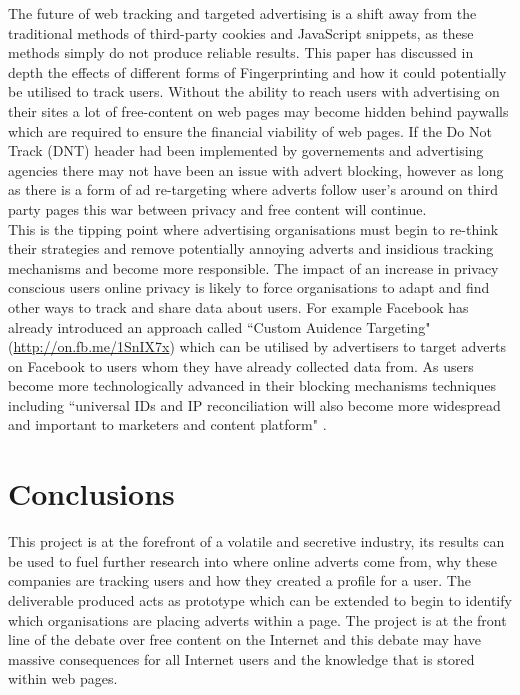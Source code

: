 \documentclass[12pt]{article}
\begin{document}
The future of web tracking and targeted advertising is a shift away from the traditional methods of third-party cookies and JavaScript snippets, as these methods simply do not produce reliable results. This paper has discussed in depth the effects of different forms of Fingerprinting and how it could potentially be utilised to track users. Without the ability to reach users with advertising on their sites a lot of free-content on web pages may become hidden behind paywalls which are required to ensure the financial viability of web pages. If the Do Not Track (DNT) header had been implemented by governements and advertising agencies there may not have been an issue with advert blocking, however as long as there is a form of ad re-targeting where adverts follow user's around on third party pages this war between privacy and free content will continue.  \\

This is the tipping point where advertising organisations must begin to re-think their strategies and remove potentially annoying adverts and insidious tracking mechanisms and become more responsible. The impact of an increase in privacy conscious users online privacy is likely to force organisations to adapt and find other ways to track and share data about users. For example Facebook has already introduced an approach called ``Custom Auidence Targeting" (\url{http://on.fb.me/1SnIX7x}) which can be utilised by advertisers to target adverts on Facebook to users whom they have already collected data from. As users become more technologically advanced in their blocking mechanisms techniques including ``universal IDs and IP reconciliation will also become more widespread and important to marketers and content platform" \parencite{tippingPoint}.

\section{Conclusions}
This project is at the forefront of a volatile and secretive industry, its results can be used to fuel further research into where online adverts come from, why these companies are tracking users and how they created a profile for a user. The deliverable produced acts as prototype which can be extended to begin to identify which organisations are placing adverts within a page. The project is at the front line of the debate over free content on the Internet and this debate may have massive consequences for all Internet users and the knowledge that is stored within web pages. \\
\end{document}
